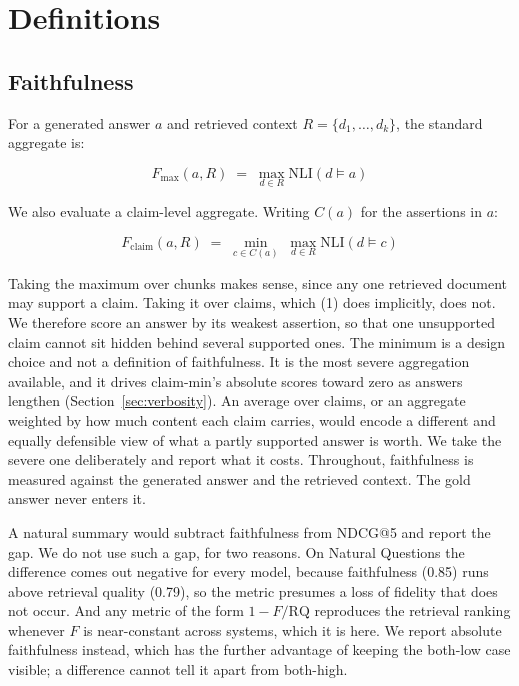 \documentclass[11pt]{article}
\newcommand{\movableblock}[1]{}             %
\newcommand{\movableblock}[1]{}
\begin{document}
\movableblock{sections/beyond-nli}


\section{Definitions}
\label{sec:defs}


\subsection{Faithfulness}
\label{sec:def-faith}

For a generated answer $a$ and retrieved context $R = \{d_1, \ldots, d_k\}$, the standard aggregate is:

\begin{equation}
F_{\max}(a, R) \;=\; \max_{d \in R} \mathrm{NLI}(d \models a)
\end{equation}

We also evaluate a claim-level aggregate. Writing $C(a)$ for the assertions in $a$:

\begin{equation}
F_{\mathrm{claim}}(a, R) \;=\; \min_{c \in C(a)} \; \max_{d \in R} \mathrm{NLI}(d \models c)
\end{equation}

Taking the maximum over chunks makes sense, since any one retrieved document may support a claim. Taking it over claims, which (1) does implicitly, does not. We therefore score an answer by its weakest assertion, so that one unsupported claim cannot sit hidden behind several supported ones. The minimum is a design choice and not a definition of faithfulness. It is the most severe aggregation available, and it drives claim-min's absolute scores toward zero as answers lengthen (Section~\ref{sec:verbosity}). An average over claims, or an aggregate weighted by how much content each claim carries, would encode a different and equally defensible view of what a partly supported answer is worth. We take the severe one deliberately and report what it costs. Throughout, faithfulness is measured against the generated answer and the retrieved context. The gold answer never enters it.

A natural summary would subtract faithfulness from NDCG@5 and report the gap. We do not use such a gap, for two reasons. On Natural Questions the difference comes out negative for every model, because faithfulness (0.85) runs above retrieval quality (0.79), so the metric presumes a loss of fidelity that does not occur. And any metric of the form $1 - F/\mathrm{RQ}$ reproduces the retrieval ranking whenever $F$ is near-constant across systems, which it is here. We report absolute faithfulness instead, which has the further advantage of keeping the both-low case visible; a difference cannot tell it apart from both-high.
\end{document}
